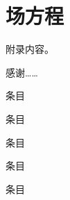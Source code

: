 \documentclass[academic,ncu,newenv]{ncuthesis}
\begin{document}
\section{场方程}
附录内容。
\backmatter

\begin{acknowledgements}
感谢……
\end{acknowledgements}
\begin{researchresults}
\begin{published}
\item 条目
\end{published}
\begin{tobepublished}
\item 条目
\end{tobepublished}
\begin{reports}
\item 条目
\end{reports}
\begin{others}[另外还有]
\item 条目
\end{others}
\begin{papers}
\item 条目
\end{papers}
\end{researchresults}
\end{document}
